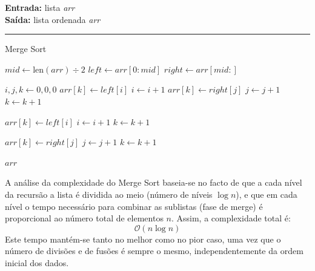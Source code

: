 \documentclass[conference]{IEEEtran}
\begin{document}
\begin{algorithm}[H]
    \raggedright
    \vspace{.1em}
    \textbf{Entrada:} lista \textit{arr} \\
    \textbf{Saída:} lista ordenada \textit{arr} \\
    \vspace{.5em}
    \hrule 
    \caption{Merge Sort}
    \begin{algorithmic}[1]
                \State $mid \gets \text{len}(arr) \div 2$
                \State $left \gets arr[0 : mid]$
                \State $right \gets arr[mid : ]$
                
                \State {}
                \State {}
    
                \State $i, j, k \gets 0, 0, 0$
                        \State $arr[k] \gets left[i]$
                        \State $i \gets i + 1$
                    \Else
                        \State $arr[k] \gets right[j]$
                        \State $j \gets j + 1$
                    \EndIf
                    \State $k \gets k + 1$
                \EndWhile
    
                    \State $arr[k] \gets left[i]$
                    \State $i \gets i + 1$
                    \State $k \gets k + 1$
                \EndWhile
    
                    \State $arr[k] \gets right[j]$
                    \State $j \gets j + 1$
                    \State $k \gets k + 1$
                \EndWhile
            \EndIf
        \EndFunction
    
        \State {}
        \State \Return $arr$
    \end{algorithmic}
\end{algorithm}

A análise da complexidade do Merge Sort baseia-se no facto de que a cada nível da recursão a lista é dividida ao meio (número de níveis \(\log n\)), e que em cada nível o tempo necessário para combinar as sublistas (fase de merge) é proporcional ao número total de elementos \(n\). Assim, a complexidade total é:
\[
\mathcal{O}(n \log n)
\]
Este tempo mantém-se tanto no melhor como no pior caso, uma vez que o número de divisões e de fusões é sempre o mesmo, independentemente da ordem inicial dos dados.
\end{document}
